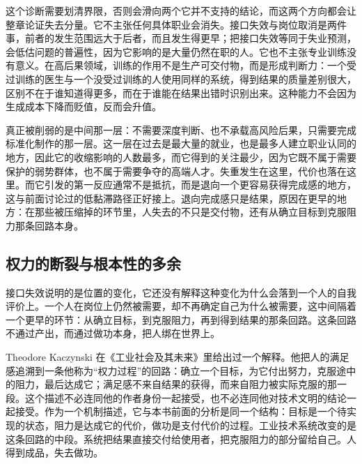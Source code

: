 
这个诊断需要划清界限，否则会滑向两个它并不支持的结论，而这两个方向都会让整章论证失去分量。它不主张任何具体职业会消失。接口失效与岗位取消是两件事，前者的发生范围远大于后者，而且发生得更早；把接口失效等同于失业预测，会低估问题的普遍性，因为它影响的是大量仍然在职的人。它也不主张专业训练没有意义。在高后果领域，训练的作用不是生产可交付物，而是形成判断力：一个受过训练的医生与一个没受过训练的人使用同样的系统，得到结果的质量差别很大，区别不在于谁知道得更多，而在于谁能在结果出错时识别出来。这种能力不会因为生成成本下降而贬值，反而会升值。

真正被削弱的是中间那一层：不需要深度判断、也不承载高风险后果，只需要完成标准化制作的那一层。这一层在过去是最大量的就业，也是最多人建立职业认同的地方，因此它的收缩影响的人数最多，而它得到的关注最少，因为它既不属于需要保护的弱势群体，也不属于需要争夺的高端人才。失重发生在这里，代价也落在这里。而它引发的第一反应通常不是抵抗，而是退向一个更容易获得完成感的地方，这与前面讨论过的低黏滞路径正好接上。退向完成感只是结果，原因在更早的地方：在那些被压缩掉的环节里，人失去的不只是交付物，还有从确立目标到克服阻力那条回路本身。

\subsection{权力的断裂与根本性的多余}

接口失效说明的是位置的变化，它还没有解释这种变化为什么会落到一个人的自我评价上。一个人在岗位上仍然被需要，却不再确定自己为什么被需要，这中间隔着一个更早的环节：从确立目标，到克服阻力，再到得到结果的那条回路。这条回路不通过产出，而通过做功本身，把人绑在世界上。


Theodore Kaczynski 在《工业社会及其未来》里给出过一个解释。他把人的满足感追溯到一条他称为“权力过程”的回路：确立一个目标，为它付出努力，克服途中的阻力，最后达成它；满足感不来自结果的获得，而来自阻力被实际克服的那一段\cite{kaczynski1995industrial}。这个描述不必连同他的作者身份一起接受，也不必连同他对技术文明的结论一起接受。作为一个机制描述，它与本书前面的分析是同一个结构：目标是一个待实现的状态，阻力是达成它的代价，做功是支付代价的过程。工业技术系统改变的是这条回路的中段。系统把结果直接交付给使用者，把克服阻力的部分留给自己。人得到成品，失去做功。

